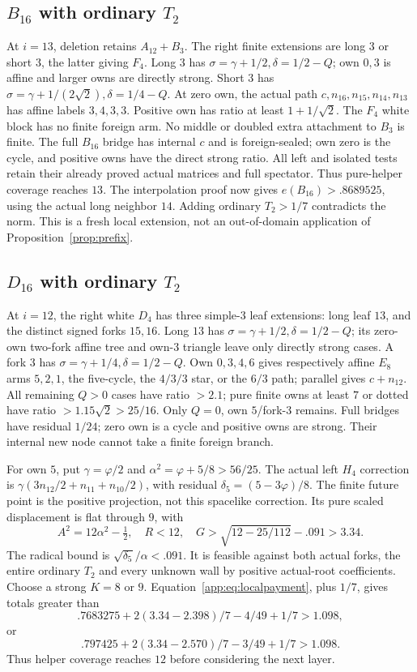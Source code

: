 \documentclass[11pt]{article}
\theoremstyle{definition}
\theoremstyle{remark}
\begin{document}
\subsection[B16 with ordinary T2]{\(B_{16}\) with ordinary \(T_2\)}
At \(i=13\), deletion retains \(A_{12}+B_3\).
The right finite extensions are long \(3\) or
short \(3\), the latter giving \(F_4\).
Long \(3\) has
\(\sigma=\gamma+1/2,\delta=1/2-Q\);
own \(0,3\) is affine and larger owns are
directly strong.
Short \(3\) has
\(\sigma=\gamma+1/(2\sqrt2),\delta=1/4-Q\).
At zero own, the actual path
\(c,n_{16},n_{15},n_{14},n_{13}\) has affine
labels \(3,4,3,3\).
Positive own has ratio at least
\(1+1/\sqrt2\).
The \(F_4\) white block has no finite foreign
arm. No middle or doubled extra attachment
to \(B_3\) is finite.
The full \(B_{16}\) bridge has internal \(c\)
and is foreign-sealed; own zero is the cycle,
and positive owns have the direct strong ratio.
All left and isolated tests retain their
already proved actual matrices and full spectator.
Thus pure-helper coverage reaches \(13\).
The interpolation proof now gives
\(e(B_{16})>.8689525\), using the actual long
neighbor \(14\). Adding ordinary \(T_2>1/7\)
contradicts the norm. This is a fresh local
extension, not an out-of-domain application
of Proposition~\ref{prop:prefix}.

\subsection[D16 with ordinary T2]{\(D_{16}\) with ordinary \(T_2\)}
At \(i=12\), the right white \(D_4\) has
three simple-\(3\) leaf extensions: long leaf
\(13\), and the distinct signed forks \(15,16\).
Long \(13\) has
\(\sigma=\gamma+1/2,\delta=1/2-Q\);
its zero-own two-fork affine tree and own-\(3\)
triangle leave only directly strong cases.
A fork \(3\) has
\(\sigma=\gamma+1/4,\delta=1/2-Q\).
Own \(0,3,4,6\) gives respectively affine
\(E_8\) arms \(5,2,1\), the five-cycle,
the \(4/3/3\) star, or the \(6/3\) path;
parallel gives \(c+n_{12}\).
All remaining \(Q>0\) cases have ratio \(>2.1\);
pure finite owns at least \(7\) or dotted have
ratio \(>1.15\sqrt2>25/16\).
Only \(Q=0\), own \(5\)/fork-\(3\) remains.
Full bridges have residual \(1/24\);
zero own is a cycle and positive owns are
strong. Their internal new node cannot
take a finite foreign branch.

For own \(5\), put \(\gamma=\varphi/2\) and
\(\alpha^2=\varphi+5/8>56/25\).
The actual left \(H_4\) correction is
\(\gamma(3n_{12}/2+n_{11}+n_{10}/2)\),
with residual \(\delta_5=(5-3\varphi)/8\).
The finite future point is the positive
projection, not this spacelike correction.
Its pure scaled displacement is flat
through \(9\), with
\[
 A^2=12\alpha^2-\tfrac12,\quad
 R<12,\quad
 G>\sqrt{12-25/112}-.091>3.34.
\]
The radical bound is
\(\sqrt{\delta_5}/\alpha<.091\).
It is feasible against both actual forks,
the entire ordinary \(T_2\) and every unknown
wall by positive actual-root coefficients.
Choose a strong \(K=8\) or \(9\).
Equation~\eqref{app:eq:localpayment}, plus \(1/7\),
gives totals greater than
\[
 .7683275+2(3.34-2.398)/7-4/49+1/7>1.098,
\]
or
\[
 .797425+2(3.34-2.570)/7-3/49+1/7>1.098.
\]
Thus helper coverage reaches \(12\) before
considering the next layer.
\end{document}
